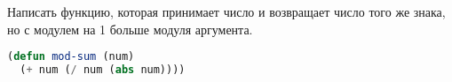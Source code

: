 Написать функцию, которая принимает число и возвращает число того же знака, но
с модулем на 1 больше модуля аргумента.

\begin{lstlisting}[language=Lisp]
(defun mod-sum (num)
  (+ num (/ num (abs num))))
\end{lstlisting}


